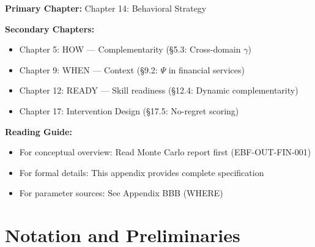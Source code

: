 
\begin{tcolorbox}[colback=purple!5!white, colframe=purple!75!black,
    title=Chapter Linkage]

\textbf{Primary Chapter:} Chapter 14: Behavioral Strategy

\textbf{Secondary Chapters:}
\begin{itemize}[nosep]
\item Chapter 5: HOW --- Complementarity (\S5.3: Cross-domain $\gamma$)
\item Chapter 9: WHEN --- Context (\S9.2: $\Psi$ in financial services)
\item Chapter 12: READY --- Skill readiness (\S12.4: Dynamic complementarity)
\item Chapter 17: Intervention Design (\S17.5: No-regret scoring)
\end{itemize}

\textbf{Reading Guide:}
\begin{itemize}[nosep]
\item For conceptual overview: Read Monte Carlo report first (EBF-OUT-FIN-001)
\item For formal details: This appendix provides complete specification
\item For parameter sources: See Appendix BBB (WHERE)
\end{itemize}

\end{tcolorbox}


\section{Notation and Preliminaries}
\label{sec:aim-notation}

